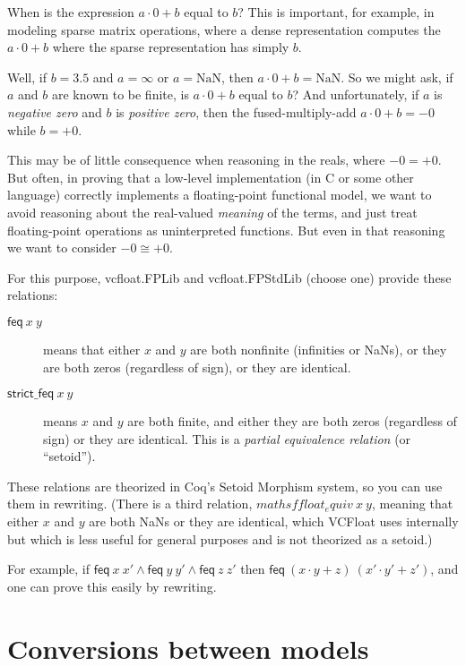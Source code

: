 \documentclass[article]{memoir}
\begin{document}
When is the expression $a\cdot 0 + b$ equal to $b$?  This is important, for example, in modeling sparse matrix operations,
where a dense representation computes the $a\cdot 0 + b$ where the sparse representation has simply $b$.

Well, if $b=3.5$ and $a=\infty$ or $a=\mathrm{NaN}$, then $a\cdot 0 + b=\mathrm{NaN}$.  So we might ask, if $a$ and $b$ are known to be finite, is $a\cdot 0 + b$ equal to $b$?   And unfortunately, if $a$ is \emph{negative zero} and $b$ is \emph{positive zero}, then the fused-multiply-add $a\cdot 0 + b = -0$ while $b=+0$.

This may be of little consequence when reasoning in the reals, where $-0 = +0$.  But often,
in proving that a low-level implementation (in C or some other language) correctly implements a floating-point functional model,
we want to avoid reasoning about the real-valued \emph{meaning} of the terms, and just treat floating-point operations
as uninterpreted functions.  But even in that reasoning we want to consider $-0 \cong +0$.

For this purpose, vcfloat.FPLib and vcfloat.FPStdLib (choose one) provide these relations:

\begin{description}
\item[$\mathsf{feq}~x~y$]    means that either $x$ and $y$ are both nonfinite (infinities or NaNs), or they are both zeros (regardless of sign), or they are identical.
\item[$\mathsf{strict\_feq}~x~y$]    means $x$ and $y$ are both finite, and either they are both zeros (regardless of sign) or they are identical.  This is a \emph{partial equivalence relation} (or ``setoid'').
\end{description}
These relations are theorized in Coq's Setoid Morphism system, so you can use them in rewriting.  (There is a third relation,
$mathsf{float_equiv}~x~y$,  meaning that either $x$ and $y$ are both NaNs or they are identical, which VCFloat uses internally but
which is less useful for general purposes and is not theorized as a setoid.)

For example, if $\mathsf{feq}~x~x' \land \mathsf{feq}~y~y' \land \mathsf{feq}~z~z'$ then
$\mathsf{feq}~(x\cdot y + z)~(x'\cdot y' + z')$, and one can prove this easily by rewriting.

\chapter{Conversions between models}
\label{conversions}
\end{document}

